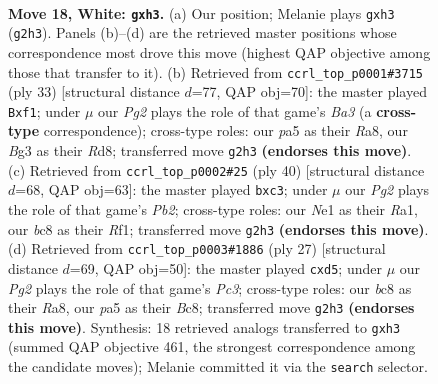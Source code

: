 \documentclass[11pt]{article}
\begin{document}
\clearpage

\begin{figure}[p]\centering
\begin{subfigure}{0.46\textwidth}\centering
\resizebox{\linewidth}{!}{%
\newchessgame
\chessboard[
  setfen={rnbr3k/5p2/1p2pn2/p1b4p/2B5/2N1P1Bp/PP3PP1/R1R1N1K1 w - - 0 18},
  showmover=false,
  pgfstyle=straightmove, color=movearrow, markmove={g2-h3}
]}
\caption{}
\end{subfigure}\hfill
\begin{subfigure}{0.46\textwidth}\centering
\resizebox{\linewidth}{!}{%
\newchessgame
\chessboard[
  setfen={rn1r2k1/p4ppp/b4n2/N1p5/Pp2P3/2P2P2/6PP/R2NKB1R b KQ - 1 17},
  showmover=false,
  pgfstyle=straightmove, color=movearrow, markmove={a6-f1}
]}
\caption{}
\end{subfigure}
\\[4pt]
\begin{subfigure}{0.46\textwidth}\centering
\resizebox{\linewidth}{!}{%
\newchessgame
\chessboard[
  setfen={r1b1k1r1/b4pp1/p2p4/4p2p/P3P1nP/1NpB2B1/1P3PP1/R4R1K w q - 0 21},
  showmover=false,
  pgfstyle=straightmove, color=movearrow, markmove={b2-c3}
]}
\caption{}
\end{subfigure}\hfill
\begin{subfigure}{0.46\textwidth}\centering
\resizebox{\linewidth}{!}{%
\newchessgame
\chessboard[
  setfen={rnb1k2r/pp3ppp/2p2b2/3P4/8/4BNP1/PP2PP1P/2KR1B1R b kq - 0 14},
  showmover=false,
  pgfstyle=straightmove, color=movearrow, markmove={c6-d5}
]}
\caption{}
\end{subfigure}
\caption{\textbf{Move 18, White: \texttt{gxh3}.} (a) Our position; Melanie plays \texttt{gxh3} (\texttt{g2h3}). Panels (b)--(d) are the retrieved master positions whose correspondence most drove this move (highest QAP objective among those that transfer to it). (b) Retrieved from \texttt{ccrl\_top\_p0001\#3715} (ply 33) [structural distance $d$=77, QAP obj=70]: the master played \texttt{Bxf1}; under $\mu$ our \emph{Pg2} plays the role of that game's \emph{Ba3} (a \textbf{cross-type} correspondence); cross-type roles: our \emph{p}a5 as their \emph{R}a8, our \emph{B}g3 as their \emph{R}d8; transferred move \texttt{g2h3} \textbf{(endorses this move)}. (c) Retrieved from \texttt{ccrl\_top\_p0002\#25} (ply 40) [structural distance $d$=68, QAP obj=63]: the master played \texttt{bxc3}; under $\mu$ our \emph{Pg2} plays the role of that game's \emph{Pb2}; cross-type roles: our \emph{N}e1 as their \emph{R}a1, our \emph{b}c8 as their \emph{R}f1; transferred move \texttt{g2h3} \textbf{(endorses this move)}. (d) Retrieved from \texttt{ccrl\_top\_p0003\#1886} (ply 27) [structural distance $d$=69, QAP obj=50]: the master played \texttt{cxd5}; under $\mu$ our \emph{Pg2} plays the role of that game's \emph{Pc3}; cross-type roles: our \emph{b}c8 as their \emph{R}a8, our \emph{p}a5 as their \emph{B}c8; transferred move \texttt{g2h3} \textbf{(endorses this move)}. Synthesis: 18 retrieved analogs transferred to \texttt{gxh3} (summed QAP objective 461, the strongest correspondence among the candidate moves); Melanie committed it via the \texttt{search} selector.}
\label{fig:thought-m34}
\end{figure}
\end{document}
